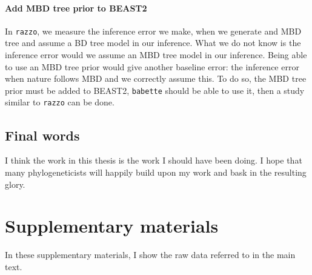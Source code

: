 \paragraph{Add MBD tree prior to BEAST2}

In \verb;razzo;, we measure the inference error we make, when we generate
and MBD tree and assume a BD tree model in our inference. What we
do not know is the inference error would we assume an MBD tree model in
our inference. Being able to use an MBD tree prior would give another
baseline error: the inference error when nature follows MBD and we
correctly assume this. To do so, the MBD tree prior must be added to BEAST2, 
\verb;babette; should be able to use it, then a study similar to \verb;razzo; can be done.

\subsection{Final words}

I think the work in this thesis is the work I should have been doing.
I hope that many phylogeneticists will happily build upon my work
and bask in the resulting glory.


\section{Supplementary materials}

In these supplementary materials, I show the raw data referred to in the main
text.



